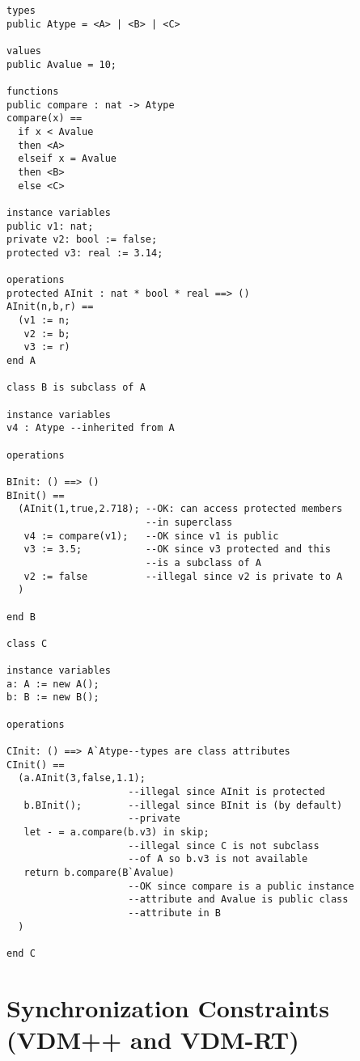 \documentclass{overturerepchap}
\begin{document}
{\begin{description}
\begin{lstlisting}
types
public Atype = <A> | <B> | <C>

values
public Avalue = 10;

functions
public compare : nat -> Atype
compare(x) ==
  if x < Avalue
  then <A>
  elseif x = Avalue
  then <B>
  else <C>

instance variables
public v1: nat;
private v2: bool := false;
protected v3: real := 3.14;

operations
protected AInit : nat * bool * real ==> ()
AInit(n,b,r) ==
  (v1 := n;
   v2 := b;
   v3 := r)
end A

class B is subclass of A

instance variables
v4 : Atype --inherited from A

operations

BInit: () ==> ()
BInit() ==
  (AInit(1,true,2.718); --OK: can access protected members
                        --in superclass
   v4 := compare(v1);   --OK since v1 is public
   v3 := 3.5;           --OK since v3 protected and this
                        --is a subclass of A
   v2 := false          --illegal since v2 is private to A
  )

end B

class C

instance variables
a: A := new A();
b: B := new B();

operations

CInit: () ==> A`Atype--types are class attributes
CInit() ==
  (a.AInit(3,false,1.1);
                     --illegal since AInit is protected
   b.BInit();        --illegal since BInit is (by default)
                     --private
   let - = a.compare(b.v3) in skip;
                     --illegal since C is not subclass
                     --of A so b.v3 is not available
   return b.compare(B`Avalue)
                     --OK since compare is a public instance
                     --attribute and Avalue is public class
                     --attribute in B
  )

end C
\end{lstlisting}



\end{description}

\chapter{Synchronization Constraints (VDM++ and VDM-RT)}\label{ch:sync}

}
\end{document}
